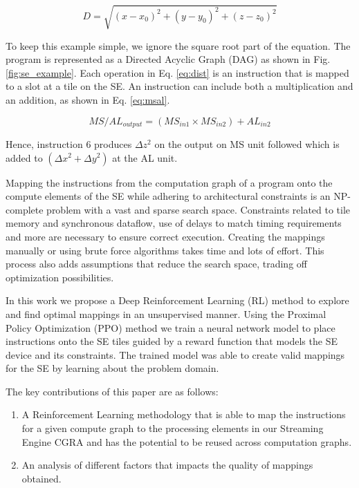 \begin{equation}
    \label{eq:dist}
    D = \sqrt{(x - x_0)^2 +(y - y_0)^2 + (z - z_0)^2}
\end{equation}

To keep this example simple, we ignore the square root part of the equation.
The program is represented as a Directed Acyclic Graph (DAG) as shown in Fig. \ref{fig:se_example}.
Each operation in Eq. \ref{eq:dist} is an instruction that is mapped to a slot at a tile on the SE.
An instruction can include both a multiplication and an addition, as shown in Eq. \ref{eq:msal}.

\begin{equation}
    \label{eq:msal}
    MS/AL_{output} = (MS_{in1} \times MS_{in2}) + AL_{in2} 
\end{equation}

Hence, instruction 6 produces $\Delta z^2$ on the output on MS unit followed which is added to $(\Delta x^2 + \Delta y^2)$ at the AL unit.


Mapping the instructions from the computation graph of a program onto the compute elements of the SE while adhering to architectural constraints is an NP-complete problem with a vast and sparse search space. 
Constraints related to tile memory and synchronous dataflow, use of delays to match timing requirements and more are necessary to ensure correct execution. 
Creating the mappings manually or using brute force algorithms takes time and lots of effort. 
This process also adds assumptions that reduce the search space, trading off optimization possibilities.  

In this work we propose a Deep Reinforcement Learning (RL) method to explore and find optimal mappings in an unsupervised manner. 
Using the Proximal Policy Optimization (PPO) method we train a neural network model to place instructions onto the SE tiles guided by a reward function that models the SE device and its constraints. 
The trained model was able to create valid mappings for the SE by learning about the problem domain. 


The key contributions of this paper are as follows:
\begin{enumerate}
    \item A Reinforcement Learning methodology that is able to map the instructions for a given compute graph to the processing elements in our Streaming Engine CGRA and has the potential to be reused across computation graphs.
    \item An analysis of different factors that impacts the quality of mappings obtained.
\end{enumerate}

